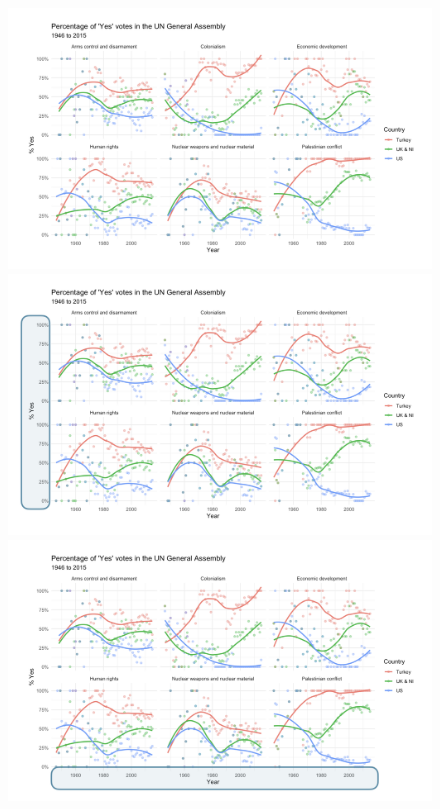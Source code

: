 \documentclass[11pt]{beamer}
\begin{document}
\begin{frame}
	

\begin{figure}
	
	\begin{overprint}
		\centering\includegraphics[width=.9\linewidth]{Images/S1/unvotes/unvotes-01}
		\onslide<2>\centering\includegraphics[width=0.9\linewidth]{Images/S1/unvotes/unvotes-02}
		\onslide<3>\centering\includegraphics[width=0.9\linewidth]{Images/S1/unvotes/unvotes-03}

\end{overprint}
\end{figure}
\end{frame}
\end{document}
